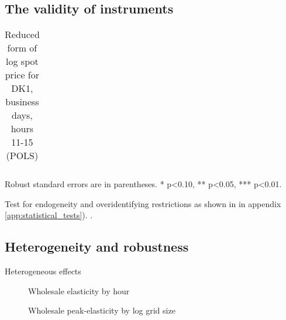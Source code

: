 \subsection{The validity of instruments}
\label{subsec:r_validity}

\begin{table}[H]
\begin{threeparttable}
  \centering
  \caption{Reduced form of log spot price for DK1, business days, hours 11-15 (POLS)}
  \label{tab:reduced_form_price_dk1}
  \footnotesize
  \begin{tabular}{lcccc}
         
  \end{tabular}
    \begin{tablenotes}
        \item Robust standard errors are in parentheses. * p<0.10, ** p<0.05, *** p<0.01.
    \end{tablenotes}
\end{threeparttable}
\end{table}

Test for endogeneity and overidentifying restrictions as shown in in appendix \ref{app:statistical_tests}). \citep{statacorp2017stata}.
\medskip\\


\subsection{Heterogeneity and robustness}
\label{subsec:r_robustness}


Heterogeneous effects
\begin{figure}[H]
  \centering
  \caption{Wholesale elasticity by hour}
  \label{fig:ws_elasticity_hour}
\end{figure}

\begin{figure}[H]
  \centering
  \caption{Wholesale peak-elasticity by log grid size}
  \label{fig:ws_elasticity_grid}
\end{figure}


